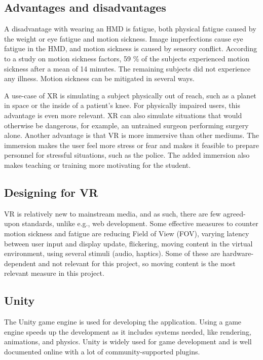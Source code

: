 \documentclass[a4paper]{report}
\begin{document}
\subsection{Advantages and disadvantages}
A disadvantage with wearing an HMD is fatigue, both physical fatigue caused by the weight or eye fatigue and motion sickness\cite{merhi_motion_2007}.
Image imperfections cause eye fatigue in the HMD\cite{kooi_visual_2004}, and motion sickness is caused by sensory conflict.
According to a study on motion sickness factors, 59 \% of the subjects experienced motion sickness after a mean of 14 minutes. The remaining subjects did not experience any illness\cite{kooi_visual_2004}. Motion sickness can be mitigated in several ways.


A use-case of XR is simulating a subject physically out of reach, such as a planet in space or the inside of a patient's knee. For physically impaired users, this advantage is even more relevant.
XR can also simulate situations that would otherwise be dangerous, for example, an untrained surgeon performing surgery alone.
Another advantage is that VR is more immersive than other mediums. The immersion makes the user feel more stress or fear and makes it feasible to prepare personnel for stressful situations, such as the police.
The added immersion also makes teaching or training more motivating for the student.\cite{freina_immersive_2015}


\subsection{Designing for VR}
VR is relatively new to mainstream media, and as such, there are few agreed-upon standards, unlike e.g., web development.
Some effective measures to counter motion sickness and fatigue are reducing Field of View (FOV), varying latency between user input and display update, flickering, moving content in the virtual environment, using several stimuli (audio, haptics)\cite{chang_virtual_2020}. Some of these are hardware-dependent and not relevant for this project, so moving content is the most relevant measure in this project.

\subsection{Unity}

The Unity game engine is used for developing the application\cite{technologies_unity_nodate}. Using a game engine speeds up the development as it includes systems needed, like rendering, animations, and physics. Unity is widely used for game development\cite{doucet_game_2021} and is well documented online with a lot of community-supported plugins.
\end{document}
